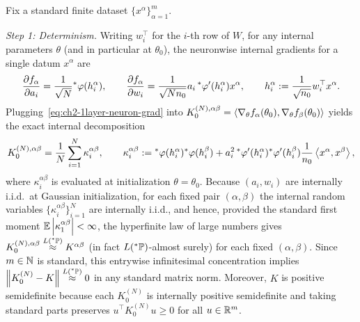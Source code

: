 \begin{proofsketch}
Fix a standard finite dataset $\{x^\alpha\}_{\alpha=1}^{m}$.

\emph{Step 1: Determinism.} Writing $w_i^\top$ for the $i$-th row of $W$, for any internal parameters $\theta$ (and in particular at $\theta_0$), the neuronwise internal gradients for a single datum $x^\alpha$ are
\begin{equation}\label{eq:ch2-1layer-neuron-grad}
\frac{\partial f_\alpha}{\partial a_i} = \frac{1}{\sqrt{N}} {}^*\varphi(h_i^\alpha), \qquad
\frac{\partial f_\alpha}{\partial w_i} = \frac{1}{\sqrt{N n_0}} a_i \, {}^*\varphi'(h_i^\alpha) x^\alpha, \qquad
h_i^\alpha := \frac{1}{\sqrt{n_0}} w_i^\top x^\alpha.
\end{equation}
Plugging~\eqref{eq:ch2-1layer-neuron-grad} into $K_0^{(N),\alpha\beta} = \left\langle \nabla_\theta f_\alpha(\theta_0), \nabla_\theta f_\beta(\theta_0) \right\rangle$ yields the exact internal decomposition
\begin{equation}\label{eq:ch2-1layer-kappa-sum}
K_0^{(N),\alpha\beta} = \frac{1}{N} \sum_{i=1}^{N} \kappa_i^{\alpha\beta}, \qquad
\kappa_i^{\alpha\beta} := {}^*\varphi(h_i^\alpha){}^*\varphi(h_i^\beta) + a_i^2 \, {}^*\varphi'(h_i^\alpha){}^*\varphi'(h_i^\beta) \frac{1}{n_0} \left\langle x^\alpha, x^\beta \right\rangle,
\end{equation}
where $\kappa_i^{\alpha\beta}$ is evaluated at initialization $\theta = \theta_0$. Because $(a_i, w_i)$ are internally i.i.d.\ at Gaussian initialization, for each fixed pair $(\alpha, \beta)$ the internal random variables $\{\kappa_i^{\alpha\beta}\}_{i=1}^{N}$ are internally i.i.d., and hence, provided the standard first moment $\mathbb{E}\left\lvert \kappa_1^{\alpha\beta} \right\rvert < \infty$, the hyperfinite law of large numbers gives $K_0^{(N),\alpha\beta} \stackrel{L({}^*\mathbb{P})}{\approx} K^{\alpha\beta}$ (in fact $L({}^*\mathbb{P})$-almost surely) for each fixed $(\alpha, \beta)$. Since $m \in \mathbb{N}$ is standard, this entrywise infinitesimal concentration implies $\left\lVert K_0^{(N)} - K \right\rVert \stackrel{L({}^*\mathbb{P})}{\approx} 0$ in any standard matrix norm. Moreover, $K$ is positive semidefinite because each $K_0^{(N)}$ is internally positive semidefinite and taking standard parts preserves $u^\top K_0^{(N)} u \ge 0$ for all $u \in \mathbb{R}^m$.


\end{proofsketch}

